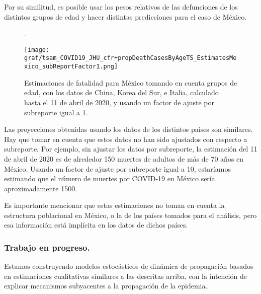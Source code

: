 Por su similitud, es posible usar los pesos relativos de las defunciones de los distintos grupos de edad y  hacer distintas predicciones para el caso de México.
\begin{figure}[h]
\caption{Estimaciones de fatalidad para México tomando en cuenta grupos de edad, con los datos de China, Korea del Sur, e Italia, calculado hasta el 11 de abril de 2020, y usando un factor de ajuste por subreporte igual a 1. }. \label{estimates_sp}
\begin{center}

    \texttt{[image: graf/tsam\_COVID19\_JHU\_cfr+propDeathCasesByAgeTS\_EstimatesMexico\_subReportFactor1.png]}
\end{center}
\end{figure}
Las proyecciones obtenidas usando los datos de los distintos paises son similares. Hay que tomar en cuenta que estos datos no han sido ajustados con respecto a subreporte. Por ejemplo, sin ajustar los datos por subreporte, la estimación del 11 de abril de 2020 es  de alrededor 150 muertes de adultos de más de 70 años en México. 
Usando un factor de ajuste por subreporte igual a 10, estaríamos estimando que el número de muertes por COVID-19 en México sería aproximadamente 1500. 


Es importante mencionar que estas estimaciones no toman en cuenta la estructura poblacional en México, o la de los países tomados para el análisis, pero esa información está implícita en los datos de dichos países. 


\subsubsection{Trabajo en progreso.} Estamos construyendo modelos estocásticos de dinámica de propagación basados en estimaciones cualitativas similares a las descritas arriba, con la intención de explicar mecanismos subyacentes a la propagación de la epidemia.  


